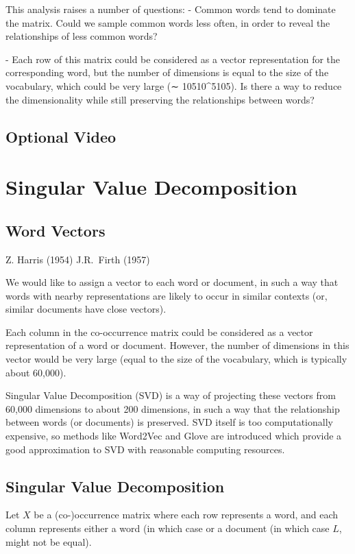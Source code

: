 \documentclass[11pt]{article}
\begin{document}
This analysis raises a number of questions:
- Common words tend to dominate the matrix.
Could we sample common words less often, in order to reveal the relationships of less common words?

- Each row of this matrix could be considered as a vector representation for the corresponding word, but the number of dimensions is equal to the size of the vocabulary, which could be very large (∼ 10510^5105).
Is there a way to reduce the dimensionality while still preserving the relationships between words?

\subsection{Optional Video}\label{subsec:optional-video}

\section{Singular Value Decomposition}\label{sec:singular-value-decomposition}
\subsection{Word Vectors}\label{subsec:word-vectors}
 Z. Harris (1954)
 J.R.\ Firth (1957)

We would like to assign a vector to each word or document, in such a way that words with nearby representations are likely to occur in similar contexts (or, similar documents have close vectors).

Each column in the co-occurrence matrix could be considered as a vector representation of a word or document.
However, the number of dimensions in this vector would be very large (equal to the size of the vocabulary, which is typically about 60,000).

Singular Value Decomposition (SVD) is a way of projecting these vectors from 60,000 dimensions to about 200 dimensions, in such a way that the relationship between words (or documents) is preserved.
SVD itself is too computationally expensive, so methods like Word2Vec and Glove are introduced which provide a good approximation to SVD with reasonable computing resources.

\subsection{Singular Value Decomposition}\label{subsec:singular-value-decomposition2}
Let $X$ be a (co-)occurrence matrix where each row represents a word, and each column represents either a word (in which case  or a document (in which case $L$, might not be equal).
\end{document}
